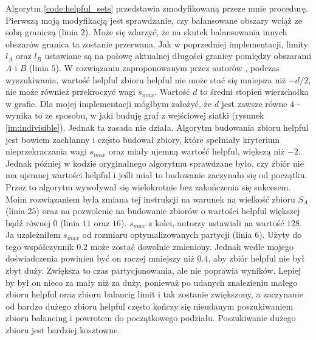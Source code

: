 Algorytm \ref{code:helpful_sets} przedstawia zmodyfikowaną przeze mnie procedurę.
Pierwszą moją modyfikacją jest sprawdzanie, czy balansowane obszary wciąż ze sobą graniczą (linia $2$).
Może się zdarzyć, że na skutek balansowania innych obszarów granica ta zostanie przerwana.
Jak w poprzedniej implementacji, limity $l_A$ oraz $l_B$ ustawiane są na połowę aktualnej długości granicy pomiędzy
obszarami $A$ i $B$ (linia $5$).
W rozwiązaniu zaproponowanym przez autorów \cite{1364754}, podczas wyszukiwania, wartość helpful zbioru helpful nie może stać się mniejsza
niż $-d/2$, nie może również przekroczyć wagi $s_{max}$.
Wartość $d$ to średni stopień wierzchołka w grafie.
Dla mojej implementacji mógłbym założyć, że $d$ jest zawsze równe $4$ - wynika to ze sposobu, w jaki buduję
graf z wejściowej siatki (rysunek \ref{im:indivisible}).
Jednak ta zasada nie działa.
Algorytm budowania zbioru helpful jest bowiem zachłanny i często budował zbiory, które spełniały kryterium nieprzekraczania
wagi $s_{max}$ oraz miały ujemną wartość helpful, większą niż $-2$.
Jednak później w kodzie oryginalnego algorytmu sprawdzane było, czy zbiór nie ma ujemnej wartości helpful i
jeśli miał to budowanie zaczynało się od początku.
Przez to algorytm wywoływał się wielokrotnie bez zakończenia się sukcesem.
Moim rozwiązaniem była zmiana tej instrukcji na warunek na wielkość zbioru $S_A$ (linia $25$) oraz na
pozwolenie na budowanie zbiorów o wartości helpful większej bądź równej $0$ (linia $11$ oraz $16$).
$s_{max}$ z kolei, autorzy \cite{article} ustawiali na wartość $128$.
Ja uzależniłem $s_{max}$ od rozmiaru optymalizowanych partycji (linia $6$).
Użyty do tego współczynnik $0.2$ może zostać dowolnie zmieniony.
Jednak wedle mojego doświadczenia powinien być on raczej mniejszy niż $0.4$, aby zbiór helpful nie był zbyt duży.
Zwiększa to czas partycjonowania, ale nie poprawia wyników.
Lepiej by był on nieco za mały niż za duży, ponieważ po udanych znalezieniu małego zbioru helpful oraz zbioru balancig
limit i tak zostanie zwiększony, a zaczynanie od bardzo dużego zbioru helpful często kończy się nieudanym poszukiwaniem
zbioru balancing i powrotem do początkowego podziału.
Poszukiwanie dużego zbioru jest bardziej kosztowne.

